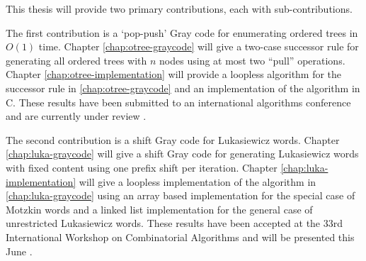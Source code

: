 This thesis will provide two primary contributions, each with sub-contributions.  

The first contribution is a `pop-push' Gray code for enumerating ordered trees in $O(1)$ time. Chapter \ref{chap:otree-graycode} will give a two-case successor rule for generating all ordered trees with $n$ nodes using at most two ``pull'' operations. Chapter \ref{chap:otree-implementation} will provide a loopless algorithm for the successor rule in \ref{chap:otree-graycode} and an implementation of the algorithm in C.  These results have been submitted to an international algorithms conference and are currently under review \cite{lapeypush}.

The second contribution is a shift Gray code for Lukasiewicz words.  Chapter \ref{chap:luka-graycode} will give a shift Gray code for generating Lukasiewicz words with fixed content using one prefix shift per iteration.  Chapter \ref{chap:luka-implementation} will give a loopless implementation of the algorithm in \ref{chap:luka-graycode} using an array based implementation for the special case of Motzkin words and a linked list implementation for the general case of unrestricted Lukasiewicz words.  These results have been accepted at the 33rd International Workshop on Combinatorial Algorithms and will be presented this June \cite{lapey2022shift}.

